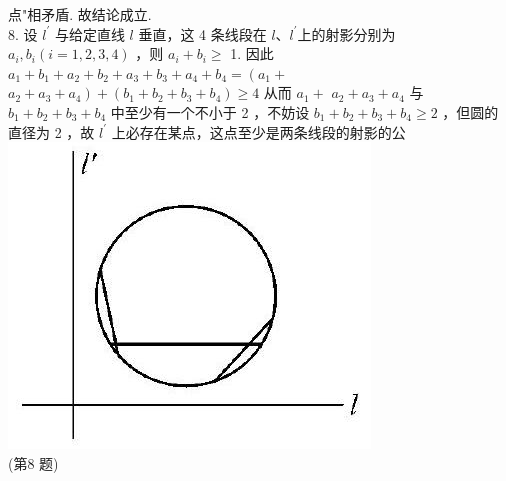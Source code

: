 \documentclass[10pt]{article}
\begin{document}
点"相矛盾. 故结论成立.\\
8. 设 $l^{\prime}$ 与给定直线 $l$ 垂直，这 4 条线段在 $l 、 l^{\prime}$上的射影分别为 $a_{i}, b_{i}(i=1,2,3,4)$ ，则 $a_{i}+b_{i} \geqslant$ 1. 因此 $a_{1}+b_{1}+a_{2}+b_{2}+a_{3}+b_{3}+a_{4}+b_{4}=\left(a_{1}+\right.$ $\left.a_{2}+a_{3}+a_{4}\right)+\left(b_{1}+b_{2}+b_{3}+b_{4}\right) \geqslant 4$ 从而 $a_{1}+$ $a_{2}+a_{3}+a_{4}$ 与 $b_{1}+b_{2}+b_{3}+b_{4}$ 中至少有一个不小于 2 ，不妨设 $b_{1}+b_{2}+b_{3}+b_{4} \geqslant 2$ ，但圆的直径为 2 ，故 $l^{\prime}$ 上必存在某点，这点至少是两条线段的射影的公\\
\includegraphics[max width=\textwidth, center]{2024_10_30_66b8e5e701da2093c133g-109(1)}\\
(第8 题)
\end{document}
